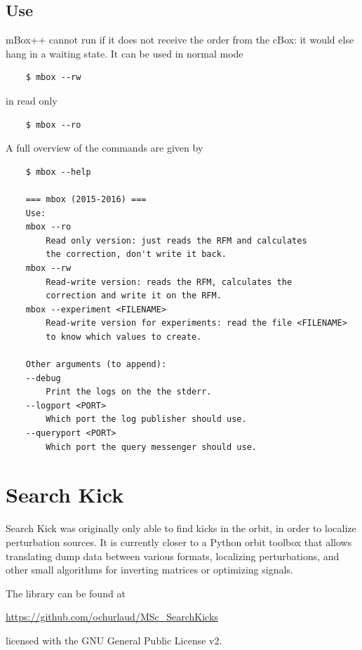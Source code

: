\section{Use}
mBox++ cannot run if it does not receive the order from the cBox: it would else hang in a waiting state.
It can be used in normal mode
\begin{verbatim}
    $ mbox --rw
\end{verbatim}
in read only
\begin{verbatim}
    $ mbox --ro
\end{verbatim}
A full overview of the commands are given by
\begin{verbatim}
    $ mbox --help

    === mbox (2015-2016) ===
    Use:
    mbox --ro
        Read only version: just reads the RFM and calculates
        the correction, don't write it back.
    mbox --rw
        Read-write version: reads the RFM, calculates the
        correction and write it on the RFM.
    mbox --experiment <FILENAME>
        Read-write version for experiments: read the file <FILENAME>
        to know which values to create.
    
    Other arguments (to append):
    --debug
        Print the logs on the the stderr.
    --logport <PORT>
        Which port the log publisher should use.
    --queryport <PORT>
        Which port the query messenger should use.
\end{verbatim}

\chapter{Search Kick}
Search Kick was originally only able to find kicks in the orbit, in order to localize perturbation sources. It is currently closer to a Python orbit toolbox that allows translating dump data between various formats, localizing perturbations, and other small algorithms for inverting matrices or optimizing signals.

The library can be found at 
\begin{center}
        \url{https://github.com/ochurlaud/MSc_SearchKicks}
\end{center}
licensed with the GNU General Public License v2.


    